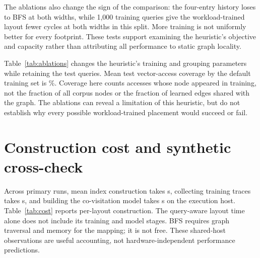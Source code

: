 \documentclass[11pt,a4paper]{report}
\newcommand{\QA}{query-aware}
\begin{document}
The ablations also change the sign of the comparison: the four-entry history loses to BFS at both widths, while 1,000 training queries give the workload-trained layout fewer cycles at both widths in this split. More training is not uniformly better for every footprint. These tests support examining the heuristic's objective and capacity rather than attributing all performance to static graph locality.

Table~\ref{tab:ablations} changes the heuristic's training and grouping parameters while retaining the test queries. Mean test vector-access coverage by the default training set is \MeanCoverage\%. Coverage here counts accesses whose node appeared in training, not the fraction of all corpus nodes or the fraction of learned edges shared with the graph. The ablations can reveal a limitation of this heuristic, but do not establish why every possible workload-trained placement would succeed or fail.

\begin{table}[htbp]\centering\small\caption[Training and grouping ablations]{Split-one heuristic ablations. Coverage is the fraction of test vector accesses to a node seen in training; model time excludes search collection and layout construction.}\label{tab:ablations}
\end{table}





\section{Construction cost and synthetic cross-check}
Across primary runs, mean index construction takes \MeanIndexSeconds{} s, collecting training traces takes \MeanTrainingSeconds{} s, and building the co-visitation model takes \MeanModelSeconds{} s on the execution host. Table~\ref{tab:cost} reports per-layout construction. The \QA{} layout time alone does not include its training and model stages. BFS requires graph traversal and memory for the mapping; it is not free. These shared-host observations are useful accounting, not hardware-independent performance predictions.
\begin{table}[htbp]\centering\caption[Layout construction cost]{Observed layout construction times for the primary float32 footprint. Shared-host wall-clock measurements; no performance-isolation claim.}\label{tab:cost}
\end{table}
\end{document}
